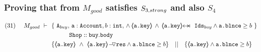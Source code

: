 \subsubsection{Proving that  from $M_{good}$ satisfies $S_{3,strong}$ and also $S_4$}
\label{s:buy:sat:S3}

\begin{lemma}
\label{l:buy:sat:S3}
 
\begin{align*}
\text{(31)}  \ \ \ \ M_{good}\ \vdash  \  \ 
		&	\{  \ \Alocals, \, \prg{a}:\prg{Account}, b:\prg{int}, \, \wedge\, {\inside{\prg{a.key}}} \, \wedge \, \protectedFrom {\prg{a.key}} {\Ids} \wedge \prg{a.\balance}\geq b \  \} \\
		& \SPT \prg{Shop}::\prg{buy}.\prg{body}\ \\  
		& \{ {\inside{\prg{a.key}}}\ \wedge\ {\PushASLong {\prg{res}} {\inside{\prg{a.key}}}}  \wedge \prg{a.\balance}\geq b \} \ \ \  || \ \ \ 
		   \{ {\inside{\prg{a.key}}}  \wedge \prg{a.\balance}\geq b \}
\end{align*}

\end{lemma}

